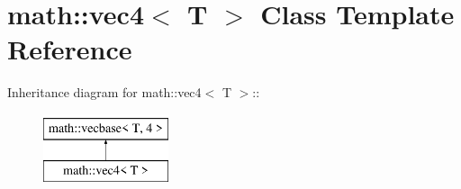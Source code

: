 \hypertarget{classmath_1_1vec4}{
\section{math::vec4$<$ T $>$ Class Template Reference}
\label{classmath_1_1vec4}
}
Inheritance diagram for math::vec4$<$ T $>$::\begin{figure}[H]
\begin{center}
\leavevmode
\includegraphics[height=2cm]{classmath_1_1vec4}
\end{center}
\end{figure}

